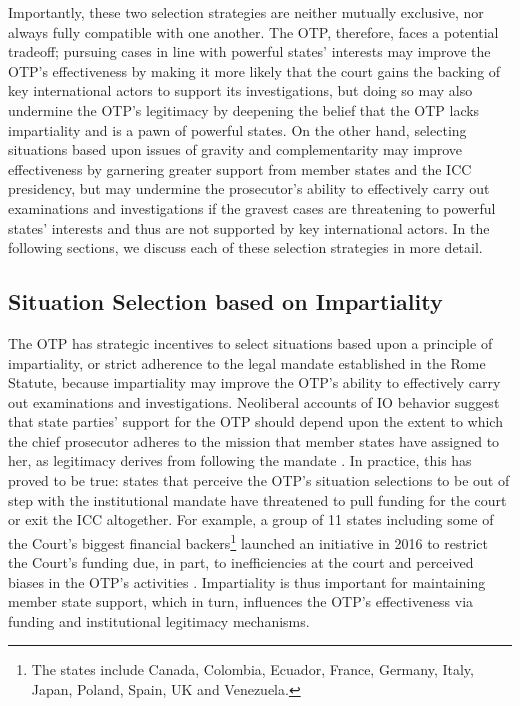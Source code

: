 Importantly, these two selection strategies are neither mutually exclusive, nor always fully compatible with one another. The OTP, therefore, faces a potential tradeoff; pursuing cases in line with powerful states' interests may improve the OTP's effectiveness by making it more likely that the court gains the backing of key international actors to support its investigations, but doing so may also undermine the OTP's legitimacy by deepening the belief that the OTP lacks impartiality and is a pawn of powerful states. On the other hand, selecting situations based upon issues of gravity and complementarity may improve effectiveness by garnering greater support from member states and the ICC presidency, but may undermine the prosecutor's ability to effectively carry out examinations and investigations if the gravest cases are threatening to powerful states' interests and thus are not supported by key international actors. In the following sections, we discuss each of these selection strategies in more detail.

\subsection*{Situation Selection based on Impartiality}

The OTP has strategic incentives to select situations based upon a principle of impartiality, or strict adherence to the legal mandate established in the Rome Statute, because impartiality may improve the OTP's ability to effectively carry out examinations and investigations. Neoliberal accounts of IO behavior suggest that state parties' support for the OTP should depend upon the extent to which the chief prosecutor adheres to the mission that member states have assigned to her, as legitimacy derives from following the mandate \citep{barnett1999politics, beardsley2012following, finnemore2009legitimacy}. In practice, this has proved to be true: states that perceive the OTP's situation selections to be out of step with the institutional mandate have threatened to pull funding for the court or exit the ICC altogether. For example, a group of 11 states including some of the Court's biggest financial backers\footnote{The states include Canada, Colombia, Ecuador, France, Germany, Italy, Japan, Poland, Spain, UK and Venezuela.} launched an initiative in 2016 to restrict the Court's funding due, in part, to inefficiencies at the court and perceived biases in the OTP's activities \citep{amnesty16}. Impartiality is thus important for maintaining member state support, which in turn, influences the OTP's effectiveness via funding and institutional legitimacy mechanisms.

